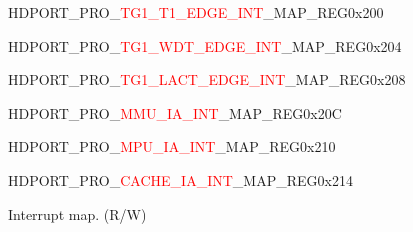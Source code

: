 \vspace{-3em}
\begin{register}{H}{DPORT\_PRO\_\textcolor{red}{TG1\_T1\_EDGE\_INT}\_MAP\_REG}{0x200}\label{regdesc:PROTG1T1EDGEINTMAPREG}
\end{register}
\vspace{-3em}
\begin{register}{H}{DPORT\_PRO\_\textcolor{red}{TG1\_WDT\_EDGE\_INT}\_MAP\_REG}{0x204}\label{regdesc:PROTG1WDTEDGEINTMAPREG}
\end{register}
\vspace{-3em}
\begin{register}{H}{DPORT\_PRO\_\textcolor{red}{TG1\_LACT\_EDGE\_INT}\_MAP\_REG}{0x208}\label{regdesc:PROTG1LACTEDGEINTMAPREG}
\end{register}
\vspace{-3em}
\begin{register}{H}{DPORT\_PRO\_\textcolor{red}{MMU\_IA\_INT}\_MAP\_REG}{0x20C}\label{regdesc:PROMMUIAINTMAPREG}
\end{register}
\vspace{-3em}
\begin{register}{H}{DPORT\_PRO\_\textcolor{red}{MPU\_IA\_INT}\_MAP\_REG}{0x210}\label{regdesc:PROMPUIAINTMAPREG}
\end{register}
\vspace{-3em}
\begin{register}{H}{DPORT\_PRO\_\textcolor{red}{CACHE\_IA\_INT}\_MAP\_REG}{0x214}\label{regdesc:PROCACHEIAINTMAPREG}
%
%
\regnewline%
\begin{regdesc}\begin{reglist}
\item [DPORT\_PRO\_\textcolor{red}{*}\_MAP]Interrupt map. (R/W)
\end{reglist}\end{regdesc}
\end{register}


